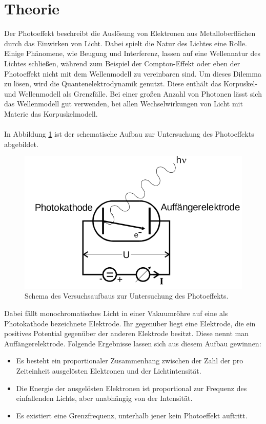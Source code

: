\maketitle
\setcounter{page}{1}
\tableofcontents
\newpage
{}
\section{Theorie}
Der Photoeffekt beschreibt die Auslösung von Elektronen aus Metalloberflächen
durch das Einwirken von Licht. Dabei spielt die Natur des Lichtes eine Rolle.
Einige Phänomene, wie Beugung und Interferenz, lassen auf eine Wellennatur
des Lichtes schließen, während zum Beispiel der Compton-Effekt oder eben der
Photoeffekt nicht mit dem Wellenmodell zu vereinbaren sind. Um dieses Dilemma zu lösen,
wird die Quantenelektrodynamik genutzt. Diese enthält das Korpuskel- und Wellenmodell
als Grenzfälle. Bei einer großen Anzahl von Photonen lässt sich das Wellenmodell gut verwenden,
bei allen Wechselwirkungen von Licht mit Materie das Korpuskelmodell. \\
\\
In Abbildung \ref{fig:1} ist der schematische Aufbau zur Untersuchung des Photoeffekts abgebildet.
\begin{figure}[h]
  \centering
  \includegraphics[scale=0.4]{aufbautheorie.png}
  \caption{Schema des Versuchsaufbaus zur Untersuchung des Photoeffekts.}
  \label{fig:1}
\end{figure}
Dabei fällt monochromatisches Licht in einer Vakuumröhre auf eine als Photokathode bezeichnete Elektrode.
Ihr gegenüber liegt eine Elektrode, die ein positives Potential gegenüber der anderen Elektrode besitzt.
Diese nennt man Auffängerelektrode. Folgende Ergebnisse lassen sich aus diesem Aufbau gewinnen:
\begin{itemize}
  \item Es besteht ein proportionaler Zusammenhang zwischen der Zahl der pro Zeiteinheit ausgelösten
  Elektronen und der Lichtintensität.
  \item Die Energie der ausgelösten Elektronen ist proportional zur Frequenz des einfallenden
  Lichts, aber unabhängig von der Intensität.
  \item Es existiert eine Grenzfrequenz, unterhalb jener kein Photoeffekt auftritt.
\end{itemize}
